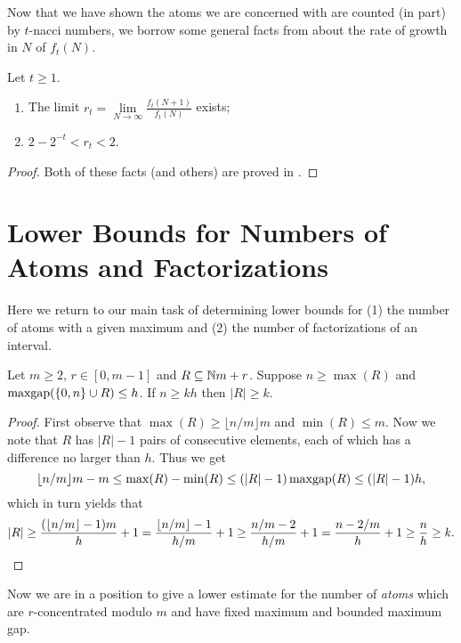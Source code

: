 Now that we have shown the atoms we are concerned with are counted (in part) by $t$-nacci numbers, we borrow some general facts from \cite{wolfram98} about the rate of growth in $N$ of $f_t(N)$.

\begin{prop} \label{prop:nacci growth}
Let $t\ge 1$.
\begin{enumerate}[label = {(\roman{*})}]
	\item The limit $r_t = \lim\limits_{N\to\infty} \frac{f_t(N+1)}{f_t(N)}$ exists;
	\item $2-2^{-t} < r_t < 2$.
\end{enumerate}
\end{prop}

\begin{proof}
Both of these facts (and others) are proved in \cite[Lemma 3.6, Corollary 3.7]{wolfram98}.
\end{proof}

\section{Lower Bounds for Numbers of Atoms and Factorizations}

Here we return to our main task of determining lower bounds for (1) the number of atoms with a given maximum and (2) the number of factorizations of an interval. 


\begin{lemma} \label{lem:bounded gap but many elements}
	Let $m\ge 2$, $r\in[0,m-1]$ and $R\subseteq \mathbb{N} m + r$.
	Suppose $n \ge \max(R)$ and $\operatorname{maxgap}(\{0,n\}\cup R) \le h$.
	If $n \ge kh$ then $|R| \ge k$.
\end{lemma}

\begin{proof}
First observe that $\max(R) \ge \lfloor n/m \rfloor m$ and $\min(R) \le m$.
Now we note that $R$ has $|R|-1$ pairs of consecutive elements, each of which has a difference no larger than $h$.
Thus we get
\[ \lfloor n/m \rfloor m - m \le \max(R) - \min(R) \le (|R|-1)\operatorname{maxgap}(R) \le (|R|-1)h, \]
which in turn yields that 
\[|R| \ge \frac{(\lfloor n/m \rfloor -1)m}{h}+1 = \frac{\lfloor n/m \rfloor -1}{h/m}+1 \ge \frac{n/m-2}{h/m}+1 = \frac{n-2/m}{h}+1 \ge \frac{n}{h} \ge k.\qedhere\]
\end{proof}


Now we are in a position to give a lower estimate for the number of \textit{atoms} which are $r$-concentrated modulo $m$ and have fixed maximum and bounded maximum gap.  

